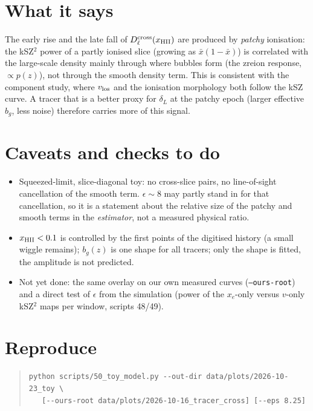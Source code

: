 \documentclass[10pt,a4paper]{article}
\newcommand{\xb}{\bar x}
\begin{document}
\section{What it says}
The early rise and the late fall of $D_\ell^{\rm cross}(x_{\rm HII})$ are produced by \emph{patchy} ionisation: the kSZ$^2$ power of a partly ionised slice (growing as $\xb(1-\xb)$) is correlated with the large-scale density mainly through where bubbles form (the zreion response, $\propto p(z)$), not through the smooth density term. This is consistent with the component study, where $v_{\rm los}$ and the ionisation morphology both follow the kSZ curve. A tracer that is a better proxy for $\delta_L$ at the patchy epoch (larger effective $b_g$, less noise) therefore carries more of this signal.

\section{Caveats and checks to do}
\begin{itemize}\setlength\itemsep{1pt}
\item Squeezed-limit, slice-diagonal toy: no cross-slice pairs, no line-of-sight cancellation of the smooth term. $\epsilon\sim8$ may partly stand in for that cancellation, so it is a statement about the relative size of the patchy and smooth terms in the \emph{estimator}, not a measured physical ratio.
\item $x_{\rm HII}<0.1$ is controlled by the first points of the digitised history (a small wiggle remains); $b_g(z)$ is one shape for all tracers; only the shape is fitted, the amplitude is not predicted.
\item Not yet done: the same overlay on our own measured curves (\texttt{--ours-root}) and a direct test of $\epsilon$ from the simulation (power of the $x_e$-only versus $v$-only kSZ$^2$ maps per window, scripts 48/49).
\end{itemize}

\section{Reproduce}
\begin{quote}\small\begin{verbatim}
python scripts/50_toy_model.py --out-dir data/plots/2026-10-23_toy \
   [--ours-root data/plots/2026-10-16_tracer_cross] [--eps 8.25]
\end{verbatim}\end{quote}
\end{document}
